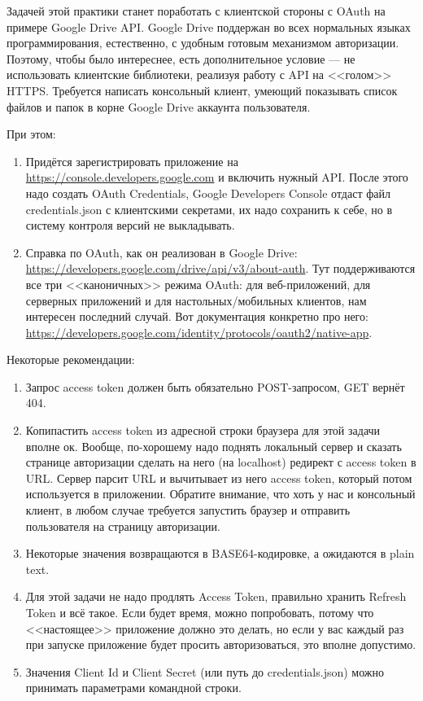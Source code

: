 \documentclass{../mcstext}
\begin{document}
\maketitle
\thispagestyle{empty}

Задачей этой практики станет поработать с клиентской стороны с OAuth на примере Google Drive API. Google Drive поддержан во всех нормальных языках программирования, естественно, с удобным готовым механизмом авторизации. Поэтому, чтобы было интереснее, есть дополнительное условие --- не использовать клиентские библиотеки, реализуя работу с API на <<голом>> HTTPS. Требуется написать консольный клиент, умеющий показывать список файлов и папок в корне Google Drive аккаунта пользователя.

При этом: 
\begin{enumerate}
    \item Придётся зарегистрировать приложение на \url{https://console.developers.google.com} и включить нужный API. После этого надо создать OAuth Credentials, Google Developers Console отдаст файл credentials.json с клиентскими секретами, их надо сохранить к себе, но в систему контроля версий не выкладывать.
    \item Справка по OAuth, как он реализован в Google Drive: \url{https://developers.google.com/drive/api/v3/about-auth}. Тут поддерживаются все три <<каноничных>> режима OAuth: для веб-приложений, для серверных приложений и для настольных/мобильных клиентов, нам интересен последний случай. Вот документация конкретно про него: \url{https://developers.google.com/identity/protocols/oauth2/native-app}.
\end{enumerate}

Некоторые рекомендации:
\begin{enumerate}
    \item Запрос access token должен быть обязательно POST-запросом, GET вернёт 404. 
    \item Копипастить access token из адресной строки браузера для этой задачи вполне ок. Вообще, по-хорошему надо поднять локальный сервер и сказать странице авторизации сделать на него (на localhost) редирект с access token в URL. Сервер парсит URL и вычитывает из него access token, который потом используется в приложении. Обратите внимание, что хоть у нас и консольный клиент, в любом случае требуется запустить браузер и отправить пользователя на страницу авторизации.
    \item Некоторые значения возвращаются в BASE64-кодировке, а ожидаются в plain text.
    \item Для этой задачи не надо продлять Access Token, правильно хранить Refresh Token и всё такое. Если будет время, можно попробовать, потому что <<настоящее>> приложение должно это делать, но если у вас каждый раз при запуске приложение будет просить авторизоваться, это вполне допустимо.
    \item Значения Client Id и Client Secret (или путь до credentials.json) можно принимать параметрами командной строки.
\end{enumerate}
\end{document}

